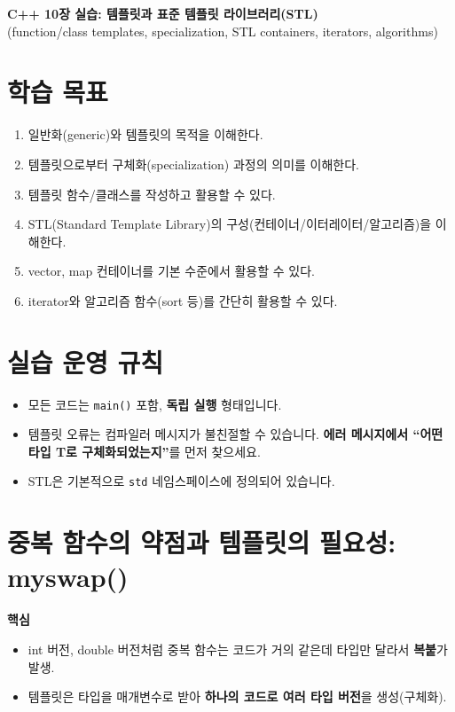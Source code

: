 \documentclass[11pt,a4paper]{article}
\begin{document}
\begin{center}
  {\LARGE \textbf{C++ 10장 실습: 템플릿과 표준 템플릿 라이브러리(STL)}}\\
  \vspace{6pt}
  {\large (function/class templates, specialization, STL containers, iterators, algorithms)}
\end{center}

\vspace{8pt}

\section*{학습 목표}
\begin{GoalBox}
\begin{enumerate}[leftmargin=18pt]
  \item 일반화(generic)와 템플릿의 목적을 이해한다.
  \item 템플릿으로부터 구체화(specialization) 과정의 의미를 이해한다.
  \item 템플릿 함수/클래스를 작성하고 활용할 수 있다.
  \item STL(Standard Template Library)의 구성(컨테이너/이터레이터/알고리즘)을 이해한다.
  \item vector, map 컨테이너를 기본 수준에서 활용할 수 있다.
  \item iterator와 알고리즘 함수(sort 등)를 간단히 활용할 수 있다.
\end{enumerate}
\end{GoalBox}

\section*{실습 운영 규칙}
\begin{itemize}[leftmargin=18pt]
  \item 모든 코드는 \texttt{main()} 포함, \textbf{독립 실행} 형태입니다.
  \item 템플릿 오류는 컴파일러 메시지가 불친절할 수 있습니다. \textbf{에러 메시지에서 “어떤 타입 T로 구체화되었는지”}를 먼저 찾으세요.
  \item STL은 기본적으로 \texttt{std} 네임스페이스에 정의되어 있습니다.
\end{itemize}

\tableofcontents
\newpage

\section{중복 함수의 약점과 템플릿의 필요성: myswap()}
\begin{GoalBox}
\textbf{핵심}
\begin{itemize}[leftmargin=18pt]
  \item int 버전, double 버전처럼 중복 함수는 코드가 거의 같은데 타입만 달라서 \textbf{복붙}가 발생.
  \item 템플릿은 타입을 매개변수로 받아 \textbf{하나의 코드로 여러 타입 버전}을 생성(구체화).
\end{itemize}
\end{GoalBox}
\end{document}
